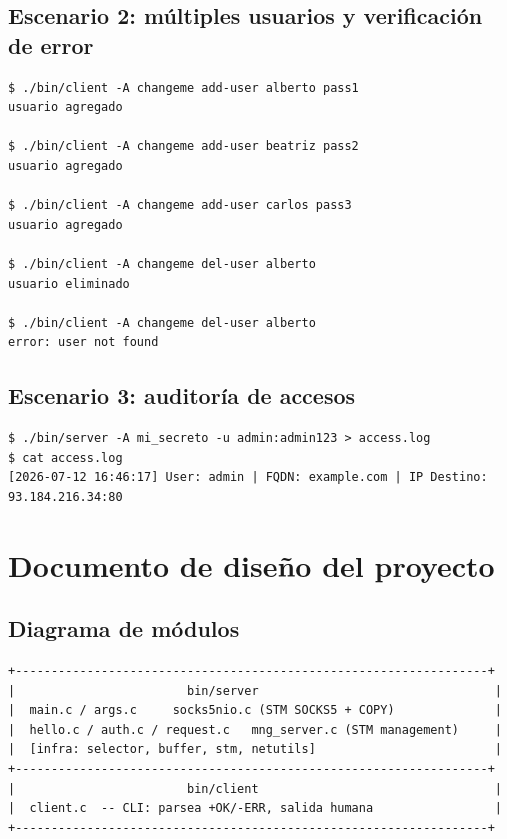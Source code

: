 \documentclass[12pt,a4paper]{article}
\begin{document}
\subsection{Escenario 2: múltiples usuarios y verificación de error}

\begin{lstlisting}
$ ./bin/client -A changeme add-user alberto pass1
usuario agregado

$ ./bin/client -A changeme add-user beatriz pass2
usuario agregado

$ ./bin/client -A changeme add-user carlos pass3
usuario agregado

$ ./bin/client -A changeme del-user alberto
usuario eliminado

$ ./bin/client -A changeme del-user alberto
error: user not found
\end{lstlisting}

\subsection{Escenario 3: auditoría de accesos}

\begin{lstlisting}
$ ./bin/server -A mi_secreto -u admin:admin123 > access.log
$ cat access.log
[2026-07-12 16:46:17] User: admin | FQDN: example.com | IP Destino: 93.184.216.34:80
\end{lstlisting}

\section{Documento de diseño del proyecto}

\subsection{Diagrama de módulos}

\begin{verbatim}
+------------------------------------------------------------------+
|                        bin/server                                 |
|  main.c / args.c     socks5nio.c (STM SOCKS5 + COPY)              |
|  hello.c / auth.c / request.c   mng_server.c (STM management)     |
|  [infra: selector, buffer, stm, netutils]                         |
+------------------------------------------------------------------+
|                        bin/client                                 |
|  client.c  -- CLI: parsea +OK/-ERR, salida humana                 |
+------------------------------------------------------------------+
\end{verbatim}
\end{document}

